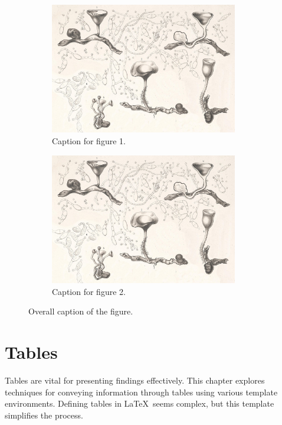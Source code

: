 \begin{figure}[!htpb]
    \centering
    \begin{subfigure}{0.45\textwidth}
        \centering
        \includegraphics[width=0.9\textwidth]{Figures/PezizaTuberosa.jpg}
        \caption{Caption for figure 1.}
        \label{fig:figure-02.1}
    \end{subfigure}
    \hspace{.5cm} %
    \begin{subfigure}{0.45\textwidth}
        \centering
        \includegraphics[width=0.9\textwidth]{Figures/PezizaTuberosa.jpg}
        \caption{Caption for figure 2.}
        \label{fig:figure-02.2}
    \end{subfigure}
    \caption{Overall caption of the figure.}
    \label{fig:figure-02}
\end{figure}

\section{Tables}
Tables are vital for presenting findings effectively. This chapter explores techniques for conveying information through tables using various template environments. Defining tables in \LaTeX\ seems complex, but this template simplifies the process.

